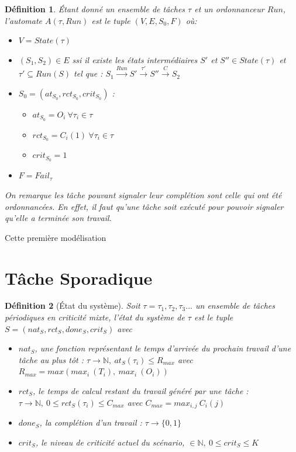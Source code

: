 \documentclass[11pt,a4paper,oneside]{book}
\theoremstyle{break}
\newtheorem{defin}{Définition}
\theoremstyle{breakplain}
\begin{document}
\begin{defin} Étant donné un ensemble de tâches $\tau$ et un ordonnanceur $Run$, l'automate $A(\tau,Run)$ est le tuple $(V, E, S_0, F)$ où:
\begin{itemize}
\item  $V=State(\tau)$
\item $(S_1,S_2) \in E$ ssi il existe les états intermédiaires $S'$ et $S'' \in State(\tau)$ et $\tau' \subseteq Run(S) $ tel que : $S_1\xrightarrow{Run}S'\xrightarrow{\tau'}S''\xrightarrow{C}S_2$
\item $S_0 = (at_{S_0}, rct_{S_0}, crit_{S_0})$ :\begin{itemize}
\item $at_{S_0} = O_i\ \forall \tau_i \in \tau$
\item $rct_{S_0} = C_i(1)\ \forall \tau_i \in \tau$
\item $crit_{S_0} = 1$
\end{itemize}
\item $F = Fail_\tau$
\end{itemize}

On remarque les tâche pouvant signaler leur complétion sont celle qui ont été ordonnancées. En effet, il faut qu'une tâche soit exécuté pour pouvoir signaler qu'elle a terminée son travail.

\end{defin} 

Cette première modélisation 


\section{Tâche Sporadique}


\begin{defin}[État du système]
\label{systemstate}
Soit $\tau = \tau_1, \tau_2, \tau_3 ...$ un ensemble de tâches périodiques en criticité mixte, l'état du système de $\tau$ est le tuple $S = (nat_S, rct_S, done_S, crit_S)$ avec

\begin{itemize}
\item $nat_S$, une fonction représentant le temps d'arrivée du prochain travail d'une tâche au plus tôt : $\tau \rightarrow \mathbb{N},\ at_S(\tau_i) \leq R_{max}$ avec $R_{max} = max(max_i\ (T_i),\ max_i\ (O_i))$
\item $rct_S$, le temps de calcul restant du travail généré par une tâche : $ \tau \rightarrow \mathbb{N},\ 0 \leq rct_S(\tau_i) \leq C_{max}$ avec $C_{max} = max_{i,j}\ C_i(j)$
\item $done_S$, la complétion d'un travail : $ \tau \rightarrow \{0,1\}$
\item $crit_S$, le niveau de criticité actuel du scénario, $ \in \mathbb{N},\ 0 \leq crit_S \leq K$

\end{itemize}

\end{defin}
\end{document}
